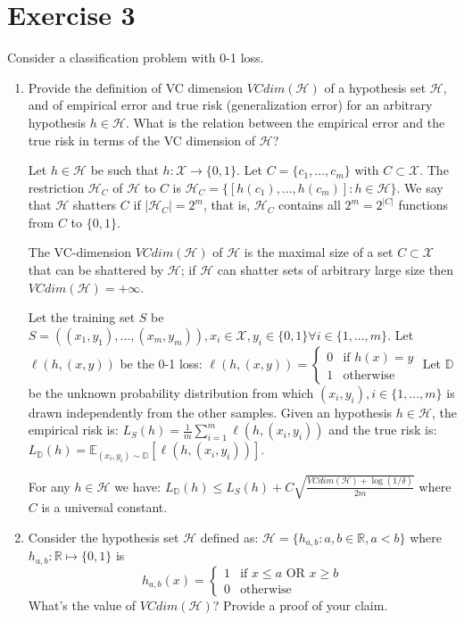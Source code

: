 \documentclass[a4paper,11pt,oneside]{book}
\begin{document}
\section{Exercise 3}
Consider a classification problem with 0-1 loss.
\begin{enumerate}
    \item Provide the definition of VC dimension $VCdim(\mathcal{H})$ of a hypothesis set $\mathcal{H}$, and of empirical error and true risk (generalization error) for an arbitrary hypothesis $h \in \mathcal{H}$. What is the relation between the empirical error and the true risk in terms of the VC dimension of $\mathcal{H}$?
        \begin{solution}
            Let $h \in \mathcal{H}$ be such that $h: \mathcal{X} \to \{0,1\}$. Let $C=\{c_1,...,c_m\}$ with $C \subset \mathcal{X}$. The restriction $\mathcal{H}_C$ of $\mathcal{H}$ to $C$ is $\mathcal{H}_C = \{[h(c_1),...,h(c_m)] : h \in \mathcal{H}\}$. We say that $\mathcal{H}$ shatters $C$ if $|\mathcal{H}_C| = 2^m$, that is, $\mathcal{H}_C$ contains all $2^m = 2^{|C|}$ functions from $C$ to $\{0,1\}$.
            
            The VC-dimension $VCdim(\mathcal{H})$ of $\mathcal{H}$ is the maximal size of a set $C \subset \mathcal{X}$ that can be shattered by $\mathcal{H}$; if $\mathcal{H}$ can shatter sets of arbitrary large size then $VCdim(\mathcal{H}) = +\infty$.
            
            Let the training set $S$ be $S=((x_1,y_1),...,(x_m,y_m)), x_i \in \mathcal{X}, y_i \in \{0,1\} \forall i \in \{1,...,m\}$. Let $\ell(h,(x,y))$ be the 0-1 loss:
            $\ell(h,(x,y)) = \begin{cases} 0 & \text{if } h(x)=y \\ 1 & \text{otherwise} \end{cases}$
            Let $\mathbb{D}$ be the unknown probability distribution from which $(x_i,y_i), i \in \{1,...,m\}$ is drawn independently from the other samples.
            Given an hypothesis $h \in \mathcal{H}$, the empirical risk is: $L_S(h) = \frac{1}{m} \sum_{i=1}^m \ell(h,(x_i,y_i))$ and the true risk is: $L_\mathbb{D}(h) = \mathbb{E}_{(x_i,y_i)\sim\mathbb{D}}[\ell(h,(x_i,y_i))]$.
            
            For any $h \in \mathcal{H}$ we have:
            $L_\mathbb{D}(h) \leq L_S(h) + C\sqrt{\frac{VCdim(\mathcal{H}) + \log(1/\delta)}{2m}}$
            where $C$ is a universal constant.
        \end{solution}
    \clearpage
    \item Consider the hypothesis set $\mathcal{H}$ defined as: $\mathcal{H} = \{h_{a,b} : a,b \in \mathbb{R}, a < b\}$ where $h_{a,b} : \mathbb{R} \mapsto \{0,1\}$ is
        $$h_{a,b}(x) = \begin{cases}
            1 & \text{if } x \leq a \text{ OR } x \geq b \\
            0 & \text{otherwise}
        \end{cases}$$
        What's the value of $VCdim(\mathcal{H})$? Provide a proof of your claim.
        


\end{enumerate}
\end{document}
